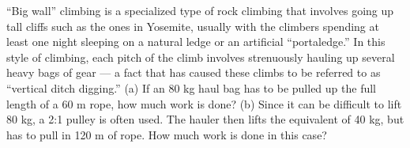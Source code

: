 ``Big wall'' climbing is a specialized type of rock climbing that involves going up
tall cliffs such as the ones in Yosemite, usually with the climbers spending at least
one night sleeping on a natural ledge or an artificial ``portaledge.''
In this style of climbing, each pitch of the climb involves strenuously hauling up several
heavy bags of gear --- a fact that has caused these climbs to be referred to as ``vertical
ditch digging.'' (a) If an 80 kg haul bag has to be pulled up the full length of a 60 m
rope, how much work is done? (b) Since it can be difficult to lift 80 kg, a 2:1 pulley is often
used. The hauler then lifts the equivalent of 40 kg, but has to pull in 120 m of rope.
How much work is done in this case?
\answercheck
